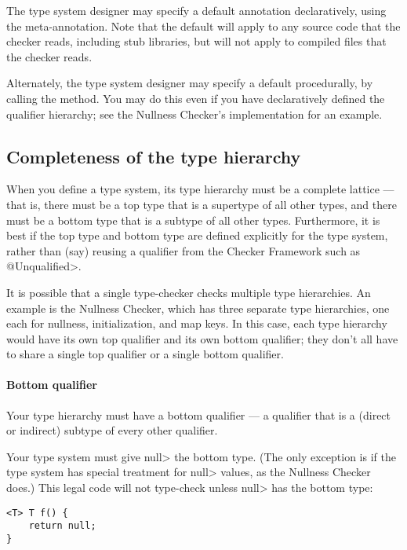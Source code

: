 The type system designer may specify a default annotation declaratively,
using the 
meta-annotation.
Note that the default will apply to any source code that the checker reads,
including stub libraries, but will not apply to compiled 
files that the checker reads.

\begin{sloppypar}
Alternately, the type system designer may specify a default procedurally,
by calling the
method.  You may do this even if you have declaratively defined the
qualifier hierarchy; see the Nullness Checker's implementation for an
example.
\end{sloppypar}


\subsection{Completeness of the type hierarchy\label{bottom-and-top-qualifier}}

When you define a type system, its type hierarchy must be a
complete lattice --- that is, there must be a top type that is a
supertype of all other types, and there must be a bottom type that is a
subtype of all other types.
Furthermore, it is best if the top type and bottom type are defined
explicitly for the type system, rather than (say) reusing a qualifier from the
Checker Framework such as \<@Unqualified>.

It is possible that a single type-checker checks multiple type hierarchies.
An example is the Nullness Checker, which has three separate type
hierarchies, one each for
nullness, initialization, and map keys.  In this case, each type hierarchy
would have its own top qualifier and its own bottom qualifier; they don't
all have to share a single top qualifier or a single bottom qualifier.


\paragraph{Bottom qualifier\label{bottom-qualifier}}
Your type hierarchy must have a bottom qualifier
--- a qualifier that is a (direct or indirect) subtype of every other
qualifier.

Your type system must give \<null> the bottom type.  (The only exception
is if the type system has special treatment for \<null> values, as the
Nullness Checker does.)  This legal code
will not type-check unless \<null> has the bottom type:
\begin{Verbatim}
<T> T f() {
    return null;
}
\end{Verbatim}

